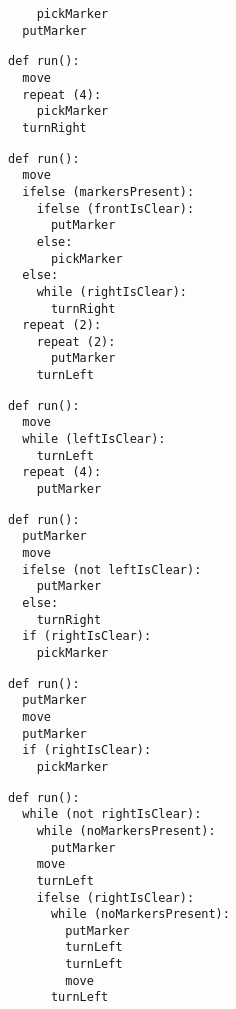 \begin{figure}
\begin{minipage}{0.20\textwidth}
\begin{verbatim}
    pickMarker
  putMarker
\end{verbatim}
\end{minipage}
\begin{minipage}{0.25\textwidth}
\begin{verbatim}
def run():
  move
  repeat (4):
    pickMarker
  turnRight
\end{verbatim}
\end{minipage}
\par\vspace{3mm}
\begin{minipage}{0.3\textwidth}
\begin{verbatim}
def run():
  move
  ifelse (markersPresent):
    ifelse (frontIsClear):
      putMarker
    else:
      pickMarker
  else:
    while (rightIsClear):
      turnRight
  repeat (2):
    repeat (2):
      putMarker
    turnLeft
\end{verbatim}
\end{minipage}
\begin{minipage}{0.20\textwidth}
\begin{verbatim}
def run():
  move
  while (leftIsClear):
    turnLeft
  repeat (4):
    putMarker
\end{verbatim}
\end{minipage}
\begin{minipage}{0.25\textwidth}
\begin{verbatim}
def run():
  putMarker
  move
  ifelse (not leftIsClear):
    putMarker
  else:
    turnRight
  if (rightIsClear):
    pickMarker
\end{verbatim}
\end{minipage}
\begin{minipage}{0.20\textwidth}
\begin{verbatim}
def run():
  putMarker
  move
  putMarker
  if (rightIsClear):
    pickMarker
\end{verbatim}
\end{minipage}
\par\vspace{3mm}
\begin{minipage}{0.3\textwidth}
\begin{verbatim}
def run():
  while (not rightIsClear):
    while (noMarkersPresent):
      putMarker
    move
    turnLeft
    ifelse (rightIsClear):
      while (noMarkersPresent):
        putMarker
        turnLeft
        turnLeft
        move
      turnLeft

\end{verbatim}
\end{minipage}
\end{figure}
